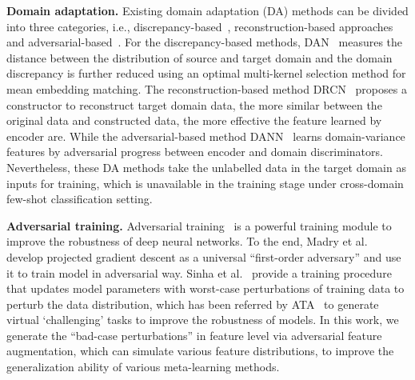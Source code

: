 \documentclass[runningheads]{utils/llncs}
\begin{document}
{\noindent \bf Domain adaptation.}
Existing domain adaptation (DA) methods can be divided into three categories, i.e., discrepancy-based~\cite{LongC0J15,ZellingerGLNS17}, reconstruction-based approaches~\cite{DengSQZKPXL21,GhifaryKZBL16} and adversarial-based~\cite{GaninL15,GaninUAGLLML17,HsuYTHT0020,TzengHSD17}. For the discrepancy-based methods, DAN~\cite{LongC0J15} measures the distance between the distribution of source and target domain and the domain discrepancy is further reduced using an optimal multi-kernel selection method for mean embedding matching. The reconstruction-based method DRCN~\cite{GhifaryKZBL16} proposes a constructor to reconstruct target domain data, the more similar between the original data and constructed data, the more effective the feature learned by encoder are. While 
the adversarial-based method DANN~\cite{GaninUAGLLML17} learns domain-variance features by adversarial progress between encoder and domain discriminators. Nevertheless, these DA methods take the unlabelled data in the target domain as inputs for training, which is unavailable in the training stage under cross-domain few-shot classification setting.

{\noindent \bf Adversarial training.}
Adversarial training~\cite{GoodfellowSS14,MadryMSTV18,ShafahiNG0DSDTG19} is a powerful training module to improve the robustness of deep neural networks. 
To the end, Madry et al.~\cite{MadryMSTV18} develop projected gradient descent as a universal ``first-order adversary'' and use it to train model in adversarial way. 
Sinha et al.~\cite{SinhaND18} provide a training procedure that updates model parameters with worst-case perturbations of training data to perturb the data distribution, which has been referred by ATA~\cite{WangD21} to generate virtual `challenging' tasks to improve the robustness of models. In this work, we generate the ``bad-case perturbations'' in feature level via adversarial feature augmentation, which can simulate various feature distributions, to improve the generalization ability of various meta-learning methods.
\end{document}
